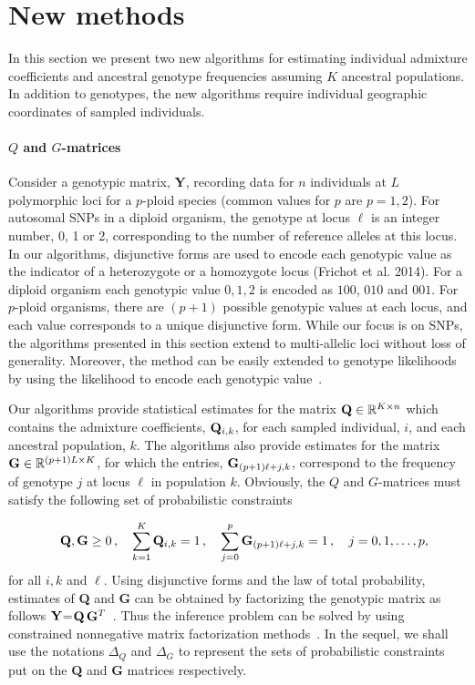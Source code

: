 \clearpage
\newpage

\section{New methods}


In this section we present two new algorithms for estimating individual
admixture coefficients and ancestral genotype frequencies assuming $K$ ancestral
populations. In addition to genotypes, the new algorithms require individual
geographic coordinates of sampled individuals.

\paragraph{$Q$ and $G$-matrices} Consider a genotypic matrix, {\bf Y}, recording
data for $n$ individuals at $L$ polymorphic loci for a $p$-ploid species (common
values for $p$ are $p = 1,2$). For autosomal SNPs in a diploid organism, the
genotype at locus $\ell$ is an integer number, 0, 1 or 2, corresponding to the
number of reference alleles at this locus. In our algorithms, disjunctive forms
are used to encode each genotypic value as the indicator of a heterozygote or a
homozygote locus (Frichot et al. 2014). For a diploid organism each genotypic
value $0,1,2$ is encoded as $100$, $010$ and $001$. For $p$-ploid organisms,
there are $(p+1)$ possible genotypic values at each locus, and each value
corresponds to a unique disjunctive form. While our focus is on SNPs, the
algorithms presented in this section extend to multi-allelic loci without loss
of generality. Moreover, the method can be easily extended to genotype
likelihoods by using the likelihood to encode each genotypic
value~\citep{Korneliussen2014}.

Our algorithms provide statistical estimates for the matrix ${\bf Q} \in
\mathbb{R}^{K \times n}$ which contains the admixture coefficients, ${\bf
  Q}_{i,k}$, for each sampled individual, $i$, and each ancestral population,
$k$. The algorithms also provide estimates for the matrix ${\bf G} \in
\mathbb{R}^{(p+1)L \times K}$, for which the entries, ${\bf G}_{(p+1)\ell + j,
  k}$, correspond to the frequency of genotype $j$ at locus $\ell$ in population
$k$. Obviously, the $Q$ and $G$-matrices must satisfy the following set of
probabilistic constraints

$$
\quad {\bf Q},{\bf G} \geq 0 \, , \quad \sum_{k=1}^K {\bf Q}_{i,k} = 1 \, ,
\quad \sum_{j=0}^p {\bf G}_{(p+1)\ell + j, k} = 1 \, , \quad j = 0,1,\dots, p,
$$
for all $i, k$ and $\ell$. Using disjunctive forms and the law of total
probability, estimates of {\bf Q} and {\bf G} can be obtained by factorizing the
genotypic matrix as follows ${\bf Y}$=${\bf Q}\,{\bf G}^T$~\citep{Frichot2014}.
Thus the inference problem can be solved by using constrained nonnegative matrix
factorization methods~\citep{Lee1999, Cichocki2009}. In the sequel, we shall use
the notations $\Delta_Q$ and $\Delta_G$ to represent the sets of probabilistic
constraints put on the {\bf Q} and {\bf G} matrices respectively.


